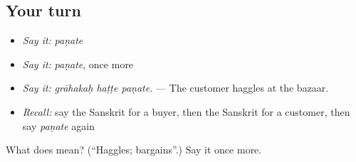 \subsection*{Your turn}
\begin{itemize}
\raggedright
  \item \emph{Say it:} \emph{paṇate}
  \item \emph{Say it:} \emph{paṇate}, once more
  \item \emph{Say it:} \emph{grāhakaḥ haṭṭe paṇate.} — The customer haggles at the bazaar.
  \item \emph{Recall:} say the Sanskrit for a buyer, then the Sanskrit for a customer, then say \emph{paṇate} again
\end{itemize}

\begin{tcolorbox}[breakable,colback=teal!4,colframe=teal!35!black,title={Before you move on}]
What does  mean? (\textquotedblleft{}Haggles; bargains\textquotedblright{}.) Say it once more.
\end{tcolorbox}
